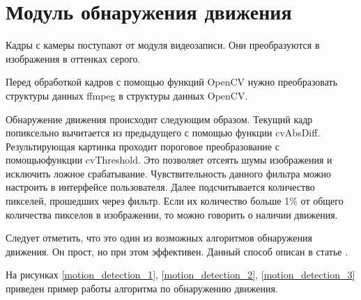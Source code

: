\section{Модуль обнаружения движения}
Кадры с камеры поступают от модуля видеозаписи.
Они преобразуются в изображения в оттенках серого.

Перед обработкой кадров с помощью функций OpenCV нужно преобразовать структуры данных ffmpeg
в структуры данных OpenCV.

Обнаружение движения происходит следующим образом.
Текущий кадр попиксельно вычитается из предыдущего с помощью функции cvAbsDiff.
Результирующая картинка проходит пороговое преобразование с помощьюфункции cvThreshold.
Это позволяет отсеять шумы изображения и исключить ложное срабатывание.
Чувствительность данного фильтра можно настроить в интерфейсе пользователя.
Далее подсчитывается количество пикселей, прошедших через фильтр.
Если их количество больше 1\% от общего количества пикселов в изображении,
то можно говорить о наличии движения.

Следует отметить, что это один из возможных алгоритмов обнаружения движения.
Он прост, но при этом эффективен. Данный способ описан в статье \cite{motion_detection}.

На рисунках \ref{motion_detection_1}, \ref{motion_detection_2}, \ref{motion_detection_3}
приведен пример работы алгоритма по обнаружению движения.

